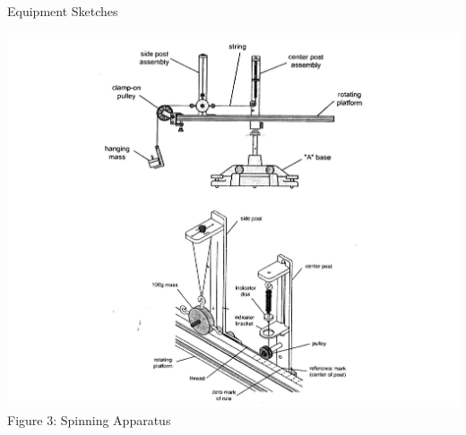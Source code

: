 \documentclass[12pt]{report}
\begin{document}
\begin{flushleft}
\begin{large}
Equipment Sketches \\
\end{large}
\begin{center}
  \includegraphics[scale=0.2]{equipment1}
  Figure 3: Spinning Apparatus
\end{center}
\newpage
\begin{large}
\end{large}

\end{flushleft}
\end{document}
